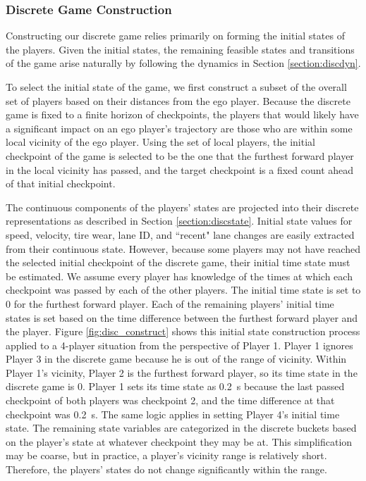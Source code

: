 \subsubsection{Discrete Game Construction}
Constructing our discrete game relies primarily on forming the initial states of the players. Given the initial states, the remaining feasible states and transitions of the game arise naturally by following the dynamics in Section \ref{section:discdyn}. 

To select the initial state of the game, we first construct a subset of the overall set of players based on their distances from the ego player. Because the discrete game is fixed to a finite horizon of checkpoints, the players that would likely have a significant impact on an ego player's trajectory are those who are within some local vicinity of the ego player. Using the set of local players, the initial checkpoint of the game is selected to be the one that the furthest forward player in the local vicinity has passed, and the target checkpoint is a fixed count ahead of that initial checkpoint. 

The continuous components of the players' states are projected into their discrete representations as described in Section \ref{section:discstate}. Initial state values for speed, velocity, tire wear, lane ID, and ``recent" lane changes are easily extracted from their continuous state. However, because some players may not have reached the selected initial checkpoint of the discrete game, their initial time state must be estimated. We assume every player has knowledge of the times at which each checkpoint was passed by each of the other players. The initial time state is set to 0 for the furthest forward player. Each of the remaining players' initial time states is set based on the time difference between the furthest forward player and the player. Figure \ref{fig:disc_construct} shows this initial state construction process applied to a 4-player situation from the perspective of Player 1. Player 1 ignores Player 3 in the discrete game because he is out of the range of vicinity. Within Player 1's vicinity, Player 2 is the furthest forward player, so its time state in the discrete game is 0. Player 1 sets its time state as \SI{0.2}{\second} because the last passed checkpoint of both players was checkpoint 2, and the time difference at that checkpoint was \SI{0.2}{\second}. The same logic applies in setting Player 4's initial time state. The remaining state variables are categorized in the discrete buckets based on the player's state at whatever checkpoint they may be at. This simplification may be coarse, but in practice, a player's vicinity range is relatively short. Therefore, the players' states do not change significantly within the range.

